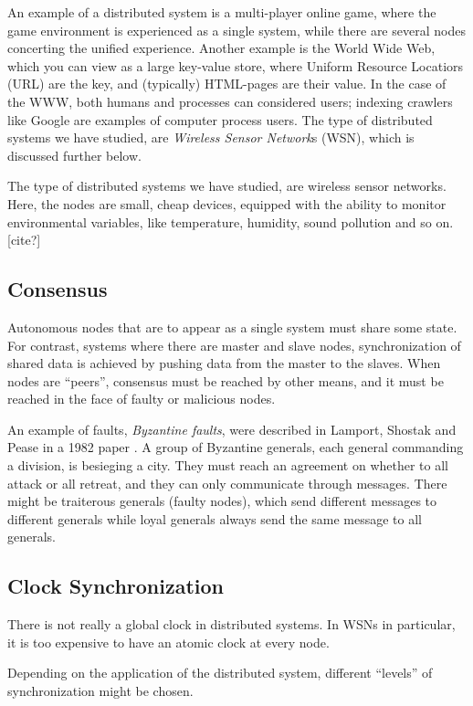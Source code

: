 \documentclass[a4paper,12pt]{article}
\begin{document}
An example of a distributed system is a multi-player online game, where
the game environment is experienced as a single system, while there
are several nodes concerting the unified experience.  Another example
is the World Wide Web, which you can view as a large key-value store,
where Uniform Resource Locatiors (URL) are the key, and (typically)
HTML-pages are their value.  In the case of the WWW, both humans and
processes can considered users; indexing crawlers like Google are
examples of computer process users.  The type of distributed systems
we have studied, are \textit{Wireless Sensor Network}s (WSN), which is
discussed further below.

The type of distributed systems we have studied, are wireless sensor
networks.  Here, the nodes are small, cheap devices, equipped with the
ability to monitor environmental variables, like temperature,
humidity, sound pollution and so on. [cite?]

\subsection{Consensus}

Autonomous nodes that are to appear as a single system must share some
state.  For contrast, systems where there are master and slave nodes,
synchronization of shared data is achieved by pushing data from the
master to the slaves.  When nodes are ``peers'', consensus must be
reached by other means, and it must be reached in the face of faulty
or malicious nodes.

An example of faults, \textit{Byzantine faults}, were described in
Lamport, Shostak and Pease in a 1982 paper \citet{Lamport82}.  A group
of Byzantine generals, each general commanding a division, is
besieging a city.  They must reach an agreement on whether to all
attack or all retreat, and they can only communicate through messages.
There might be traiterous generals (faulty nodes), which send
different messages to different generals while loyal generals always
send the same message to all generals.

\subsection{Clock Synchronization}

There is not really a global clock in distributed systems.  In WSNs in
particular, it is too expensive to have an atomic clock at every node.

Depending on the application of the distributed system, different
``levels'' of synchronization might be chosen.  
\end{document}
